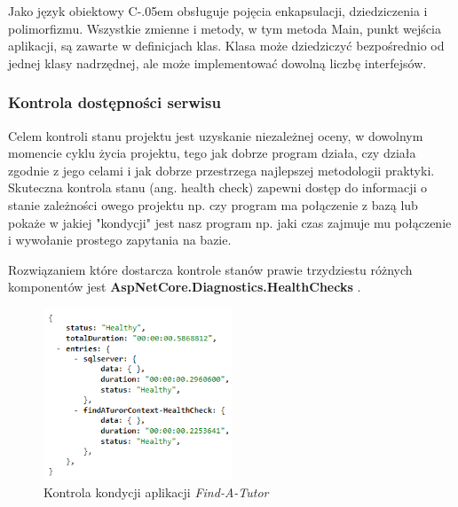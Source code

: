\documentclass[12pt]{article}
\newcommand{\Csharp}{%
  {\settoheight{\dimen0}{C}C\kern-.05em \resizebox{!}{\dimen0}{\raisebox{\depth}{\# }}}}
\numberwithin{figure}{section}
\begin{document}
\begin{sloppypar}
Jako język obiektowy \Csharp obsługuje pojęcia enkapsulacji, dziedziczenia i polimorfizmu. Wszystkie zmienne i metody, w tym metoda Main, punkt wejścia aplikacji, są zawarte w definicjach klas. Klasa może dziedziczyć bezpośrednio od jednej klasy nadrzędnej, ale może implementować dowolną liczbę interfejsów.


\subsubsection{Kontrola dostępności serwisu}
Celem kontroli stanu projektu jest uzyskanie niezależnej oceny, w dowolnym momencie cyklu życia projektu, tego jak dobrze program działa, czy działa zgodnie z jego celami i jak dobrze przestrzega najlepszej metodologii praktyki. Skuteczna kontrola stanu (ang. health check) zapewni dostęp do informacji o stanie zależności owego projektu np. czy program ma połączenie z bazą lub pokaże w jakiej "kondycji" jest nasz program np. jaki czas zajmuje mu połączenie i wywołanie prostego zapytania na bazie. 
    
Rozwiązaniem które dostarcza kontrole stanów prawie trzydziestu różnych komponentów jest \textbf{AspNetCore.Diagnostics.HealthChecks} \cite{health-checks-github}.
        
\begin{figure}[H] 
    \centering
    \includegraphics[width=0.5\textwidth]{images/chapter_3/api-health-check.png}
    \caption{Kontrola kondycji aplikacji \textit{Find-A-Tutor}}
    \label{fig:health-check}
\end{figure}
    

\end{sloppypar}
\end{document}
